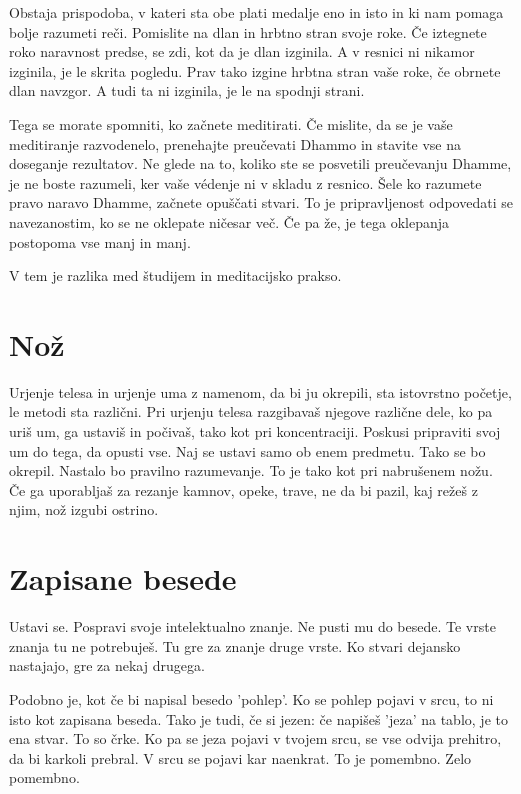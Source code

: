 Obstaja prispodoba, v kateri sta obe plati medalje eno in isto in ki nam pomaga bolje razumeti reči. Pomislite na dlan in hrbtno stran svoje roke. Če iztegnete roko naravnost predse, se zdi, kot da je dlan izginila. A v resnici ni nikamor izginila, je le skrita pogledu. Prav tako izgine hrbtna stran vaše roke, če obrnete dlan navzgor. A tudi ta ni izginila, je le na spodnji strani.

Tega se morate spomniti, ko začnete meditirati. Če mislite, da se je vaše meditiranje razvodenelo, prenehajte preučevati Dhammo in stavite vse na doseganje rezultatov. Ne glede na to, koliko ste se posvetili preučevanju Dhamme, je ne boste razumeli, ker vaše védenje ni v skladu z resnico. Šele ko razumete pravo naravo Dhamme, začnete opuščati stvari. To je pripravljenost odpovedati se navezanostim, ko se ne oklepate ničesar več. Če pa že, je tega oklepanja postopoma vse manj in manj.

V tem je razlika med študijem in meditacijsko prakso.

\section{Nož}

Urjenje telesa in urjenje uma z namenom, da bi ju okrepili, sta istovrstno početje, le metodi sta različni. Pri urjenju telesa razgibavaš njegove različne dele, ko pa uriš um, ga ustaviš in počivaš, tako kot pri koncentraciji. Poskusi pripraviti svoj um do tega, da opusti vse. Naj se ustavi samo ob enem predmetu. Tako se bo okrepil. Nastalo bo pravilno razumevanje. To je tako kot pri nabrušenem nožu. Če ga uporabljaš za rezanje kamnov, opeke, trave, ne da bi pazil, kaj režeš z njim, nož izgubi ostrino.

\section{Zapisane besede}

Ustavi se. Pospravi svoje intelektualno znanje. Ne pusti mu do besede. Te vrste znanja tu ne potrebuješ. Tu gre za znanje druge vrste. Ko stvari dejansko nastajajo, gre za nekaj drugega.

Podobno je, kot če bi napisal besedo 'pohlep'. Ko se pohlep pojavi v srcu, to ni isto kot zapisana beseda. Tako je tudi, če si jezen: če napišeš 'jeza' na tablo, je to ena stvar. To so črke. Ko pa se jeza pojavi v tvojem srcu, se vse odvija prehitro, da bi karkoli prebral. V srcu se pojavi kar naenkrat. To je pomembno. Zelo pomembno.

